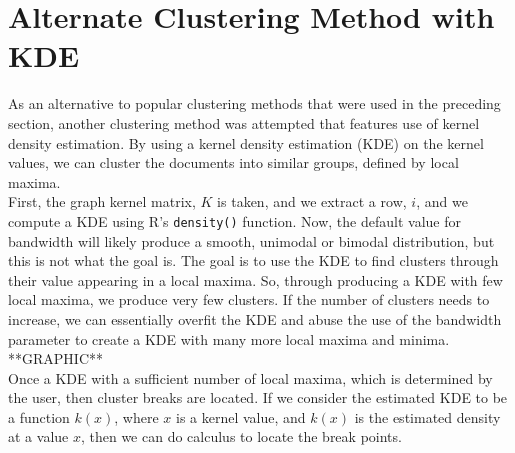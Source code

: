 %
%
%

\section{Alternate Clustering Method with KDE}

As an alternative to popular clustering methods that were used in the preceding section, another clustering method was attempted that features use of kernel density estimation. By using a kernel density estimation (KDE) on the kernel values, we can cluster the documents into similar groups, defined by local maxima. \\
First, the graph kernel matrix, $K$ is taken, and we extract a row, $i$, and we compute a KDE using R's \texttt{density()} function. Now, the default value for bandwidth will likely produce a smooth, unimodal or bimodal distribution, but this is not what the goal is. The goal is to use the KDE to find clusters through their value appearing in a local maxima. So, through producing a KDE with few local maxima, we produce very few clusters. If the number of clusters needs to increase, we can essentially overfit the KDE and abuse the use of the bandwidth parameter to create a KDE with many more local maxima and minima.\\

**GRAPHIC**\\ 

Once a KDE with a sufficient number of local maxima, which is determined by the user, then cluster breaks are located. If we consider the estimated KDE to be a function $k(x)$, where $x$ is a kernel value, and $k(x)$ is the estimated density at a value $x$, then we can do calculus to locate the break points. 

